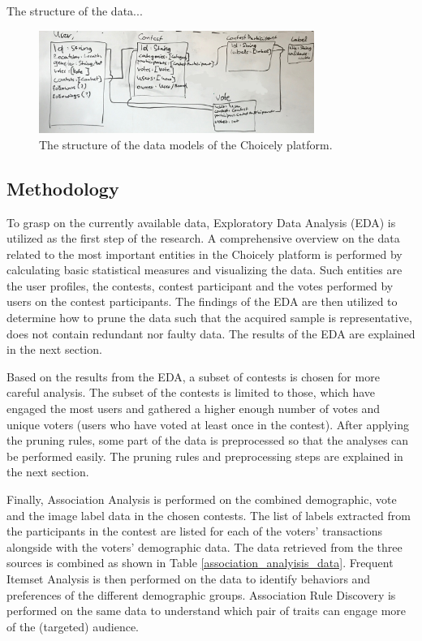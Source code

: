    The structure of the data... 
    \begin{figure}[h] 
		\begin{center}
            \includegraphics[width=0.8\textwidth]{Images/data_structure_whiteboard.jpg}
			\caption{The structure of the data models of the Choicely platform.}
			\label{choicely_data_models}
		\end{center}
    \end{figure}

\subsection{Methodology} %
    To grasp on the currently available data, Exploratory Data Analysis (EDA) is utilized as the first step of the research. A comprehensive overview on the data related to the most important entities in the Choicely platform is performed by calculating basic statistical measures and visualizing the data. Such entities are the user profiles, the contests, contest participant and the votes performed by users on the contest participants. The findings of the EDA are then utilized to determine how to prune the data such that the acquired sample is representative, does not contain redundant nor faulty data. The results of the EDA are explained in the next section. 

    Based on the results from the EDA, a subset of contests is chosen for more careful analysis. The subset of the contests is limited to those, which have engaged the most users and gathered a higher enough number of votes and unique voters (users who have voted at least once in the contest). After applying the pruning rules, some part of the data is preprocessed so that the analyses can be performed easily. The pruning rules and preprocessing steps are explained in the next section. 

    Finally, Association Analysis is performed on the combined demographic, vote and the image label data in the chosen contests. The list of labels extracted from the participants in the contest are listed for each of the voters' transactions alongside with the voters' demographic data. The data retrieved from the three sources is combined as shown in Table \ref{association_analyisis_data}. Frequent Itemset Analysis is then performed on the data to identify behaviors and preferences of the different demographic groups. Association Rule Discovery is performed on the same data to understand which pair of traits can engage more of the (targeted) audience.  

